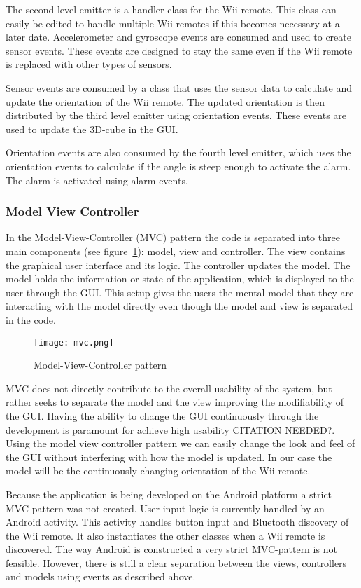 The second level emitter is a handler class for the Wii remote. This class can easily be edited to handle multiple Wii remotes if this becomes necessary at a later date. Accelerometer and gyroscope events are consumed and used to create sensor events. These events are designed to stay the same even if the Wii remote is replaced with other types of sensors.

Sensor events are consumed by a class that uses the sensor data to calculate and update the orientation of the Wii remote. The updated orientation is then distributed by the third level emitter using orientation events. These events are used to update the 3D-cube in the GUI. 

Orientation events are also consumed by the fourth level emitter, which uses the orientation events to calculate if the angle is steep enough to activate the alarm. The alarm is activated using alarm events.

\subsubsection{Model View Controller}
In the Model-View-Controller (MVC) pattern the code is separated into three main components (see figure~\ref{fig:mvc}): model, view and controller. The view contains the graphical user interface and its logic. The controller updates the model. The model holds the information or state of the application, which is displayed to the user through the GUI. This setup gives the users the mental model that they are interacting with the model directly even though the model and view is separated in the code.

\begin{figure}[h!]
  \centering
    \texttt{[image: mvc.png]}
    \caption{\footnotesize Model-View-Controller pattern}
    \label{fig:mvc}
\end{figure}

MVC does not directly contribute to the overall usability of the system, but rather seeks to separate the model and the view improving the modifiability of the GUI. Having the ability to change the GUI continuously through the development is paramount for achieve high usability CITATION NEEDED?. Using the model view controller pattern we can easily change the look and feel of the GUI without interfering with how the model is updated. In our case the model will be the continuously changing orientation of the Wii remote.

Because the application is being developed on the Android platform a strict MVC-pattern was not created. User input logic is currently handled by an Android activity. This activity handles button input and Bluetooth discovery of the Wii remote. It also instantiates the other classes when a Wii remote is discovered. The way Android is constructed a very strict MVC-pattern is not feasible. However, there is still a clear separation between the views, controllers and models using events as described above.

